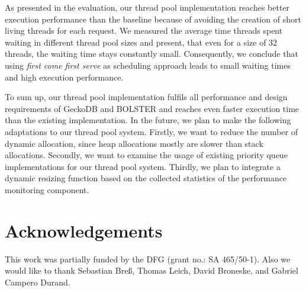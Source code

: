 \documentclass[conference]{IEEEtran}
\begin{document}
As presented in the evaluation, our thread pool implementation reaches better execution performance than the baseline because of avoiding the creation of short living threads for each request. We measured the average time threads spent waiting in different thread pool sizes and present, that even for a size of $32$ threads, the waiting time stays constantly small. Consequently, we conclude that using \emph{first come first serve} as scheduling approach leads to small waiting times and high execution performance. 

To sum up, our thread pool implementation fulfils all performance and design requirements of GeckoDB and BOLSTER and reaches even faster execution time than the existing implementation. In the future, we plan to make the following adaptations to our thread pool system. Firstly, we want to reduce the number of dynamic allocation, since heap allocations mostly are slower than stack allocations. Secondly, we want to examine the usage of existing priority queue implementations for our thread pool system. Thirdly, we plan to integrate a dynamic resizing function based on the collected statistics of the performance monitoring component. 


\section{Acknowledgements}
This work was partially funded by the DFG (grant no.: SA 465/50-1). Also we would like to thank Sebastian Bre\ss, Thomas Leich, David Broneske, and Gabriel Campero Durand.



\balance

\end{document}
